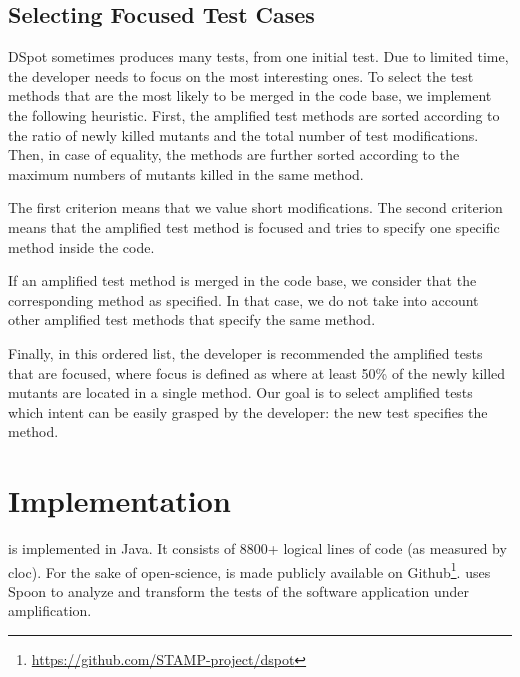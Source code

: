 
\subsection{Selecting Focused Test Cases}
\label{subsubsec:test:cases:selection:for:pr}

DSpot  sometimes produces many tests, from one initial test.
Due to limited time, the developer needs to focus on the most interesting ones.
To select the test methods that are the most likely to be merged in the code base, we implement the following  heuristic.
First, the amplified test methods are sorted according to the ratio of newly killed mutants and the total number of test modifications.
Then, in case of equality, the methods are further sorted according to the maximum numbers of mutants killed in the same method.

The first criterion means that we value short modifications.
The second criterion means that the amplified test method is focused and tries to specify one specific method inside the code.

If an amplified test method is merged in the code base, we consider that the corresponding method as specified. In that case, we do not take into account other amplified test methods that specify the same method.

Finally, in this ordered list, the developer is recommended the amplified tests that are focused, where focus is defined as where at least 50\% of the newly killed mutants are located in a single method. Our goal is to select amplified tests which intent can be easily grasped by the developer: the new test specifies the method.

\section{Implementation}

\dspot is implemented in Java.
It consists of 8800+ logical lines of code (as measured by cloc).
For the sake of open-science, \dspot is made publicly available on Github\footnote{\url{https://github.com/STAMP-project/dspot}}.
\dspot uses Spoon\cite{pawlak:hal-01169705} to analyze and transform the tests of the software application under amplification.
